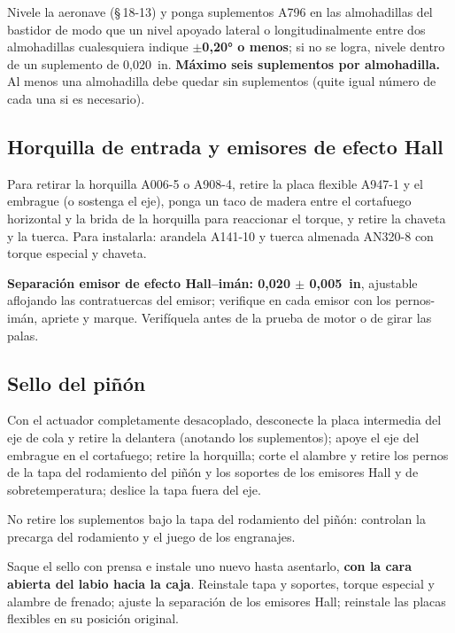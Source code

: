 Nivele la aeronave (\S\,18-13) y ponga suplementos A796 en las almohadillas del bastidor de modo que un nivel apoyado lateral o longitudinalmente entre dos almohadillas cualesquiera indique \textbf{$\pm$0,20° o menos}; si no se logra, nivele dentro de un suplemento de 0,020~in. \textbf{Máximo seis suplementos por almohadilla.} Al menos una almohadilla debe quedar sin suplementos (quite igual número de cada una si es necesario).

\subsection{Horquilla de entrada y emisores de efecto Hall}

Para retirar la horquilla A006-5 o A908-4, retire la placa flexible A947-1 y el embrague (o sostenga el eje), ponga un taco de madera entre el cortafuego horizontal y la brida de la horquilla para reaccionar el torque, y retire la chaveta y la tuerca. Para instalarla: arandela A141-10 y tuerca almenada AN320-8 con torque especial y chaveta.

\textbf{Separación emisor de efecto Hall--imán: 0,020 $\pm$ 0,005~in}, ajustable aflojando las contratuercas del emisor; verifique en cada emisor con los pernos-imán, apriete y marque. Verifíquela antes de la prueba de motor o de girar las palas.

\subsection{Sello del piñón}

Con el actuador completamente desacoplado, desconecte la placa intermedia del eje de cola y retire la delantera (anotando los suplementos); apoye el eje del embrague en el cortafuego; retire la horquilla; corte el alambre y retire los pernos de la tapa del rodamiento del piñón y los soportes de los emisores Hall y de sobretemperatura; deslice la tapa fuera del eje.

\begin{precaucion}
No retire los suplementos bajo la tapa del rodamiento del piñón: controlan la precarga del rodamiento y el juego de los engranajes.
\end{precaucion}

Saque el sello con prensa e instale uno nuevo hasta asentarlo, \textbf{con la cara abierta del labio hacia la caja}. Reinstale tapa y soportes, torque especial y alambre de frenado; ajuste la separación de los emisores Hall; reinstale las placas flexibles en su posición original.

